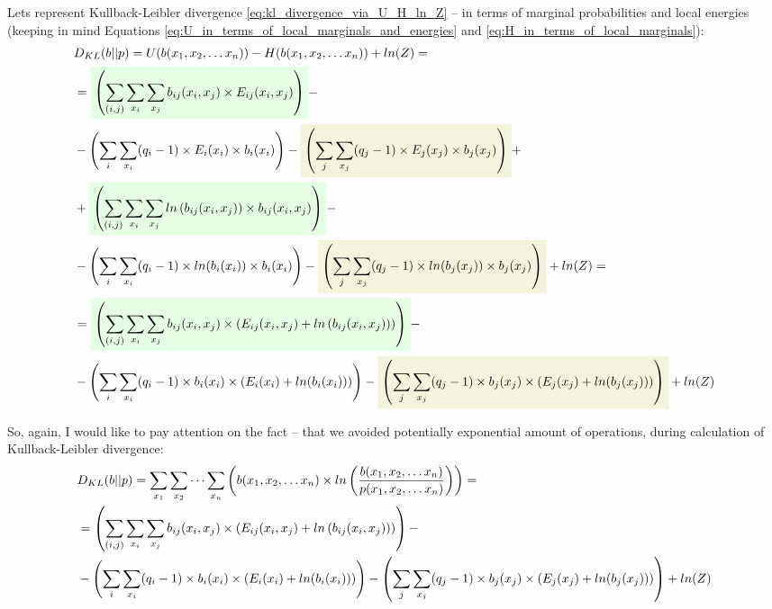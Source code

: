 \documentclass[fleqn,leqno]{article}
\newcommand{\highlight}[1]{\colorbox{green!10}{$\displaystyle#1$}}
\newcommand{\highlightred}[1]{\colorbox{olive!10}{$\displaystyle#1$}}
\begin{document}
Lets represent Kullback-Leibler divergence \eqref{eq:kl_divergence_via_U_H_ln_Z} -- in terms of marginal probabilities and local energies (keeping in mind Equations \eqref{eq:U_in_terms_of_local_marginals_and_energies} and \eqref{eq:H_in_terms_of_local_marginals}):
\begin{equation}
\begin{split}
   & D_{KL}(b||p) = U(b(x_1,x_2,\dots x_n)) - H(b(x_1,x_2,\dots x_n)) + ln(Z) = \\
   & = \highlight{\left( \sum_{(i, j)} \sum_{x_i} \sum_{x_j} b_{ij}(x_i, x_j) \times E_{ij}(x_i, x_j) \right)} - \\
   & -\left( \sum_{i} \sum_{x_i} (q_i - 1) \times E_i(x_i) \times b_i(x_i) \right) -\highlightred{\left( \sum_{j} \sum_{x_j} (q_j - 1) \times E_j(x_j) \times b_j(x_j) \right)} + \\
   & +\highlight{\left( \sum_{(i, j)} \sum_{x_i} \sum_{x_j} ln \left( b_{ij}(x_i, x_j) \right) \times b_{ij}(x_i, x_j) \right)} - \\
   & -\left( \sum_i \sum_{x_i} (q_i - 1) \times ln(b_i(x_i)) \times b_i(x_i) \right) - \highlightred{\left( \sum_j \sum_{x_j} (q_j - 1) \times ln(b_j(x_j)) \times b_j(x_j) \right)} + ln(Z) = \\
   & = \highlight{\left( \sum_{(i, j)} \sum_{x_i} \sum_{x_j} b_{ij}(x_i, x_j) \times \left( E_{ij}(x_i, x_j) + ln \left( b_{ij}(x_i, x_j) \right) \right) \right)} - \\
   & -\left( \sum_{i} \sum_{x_i} (q_i - 1) \times b_i(x_i) \times \left( E_i(x_i) + ln(b_i(x_i)) \right) \right) -\highlightred{\left( \sum_{j} \sum_{x_j} (q_j - 1) \times b_j(x_j) \times \left( E_j(x_j) + ln(b_j(x_j)) \right) \right)} + ln(Z)
\end{split}
\end{equation}

So, again, I would like to pay attention on the fact -- that we avoided potentially exponential amount of operations, during calculation of Kullback-Leibler divergence:
\begin{equation} \label{eq:D_KL}
\begin{split}
   & D_{KL}(b||p) = \sum_{x_1} \sum_{x_2} \cdots \sum_{x_n} \left( b(x_1, x_2, \dots x_n) \times ln \left( {b(x_1, x_2, \dots x_n) \over p(x_1, x_2, \dots x_n)} \right) \right) = \\
   & = \left( \sum_{(i, j)} \sum_{x_i} \sum_{x_j} b_{ij}(x_i, x_j) \times \left( E_{ij}(x_i, x_j) + ln \left( b_{ij}(x_i, x_j) \right) \right) \right) - \\
   & -\left( \sum_{i} \sum_{x_i} (q_i - 1) \times b_i(x_i) \times \left( E_i(x_i) + ln(b_i(x_i)) \right) \right) -\left( \sum_{j} \sum_{x_j} (q_j - 1) \times b_j(x_j) \times \left( E_j(x_j) + ln(b_j(x_j)) \right) \right) + ln(Z)
\end{split}
\end{equation}
\end{document}
